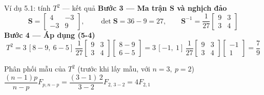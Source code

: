 \begin{frame}{Ví dụ 5.1: tính \texorpdfstring{\(T^2\)}{T2} --- kết quả}
  \small
  \textbf{Bước 3 --- Ma trận \(\mathbf{S}\) và nghịch đảo}
  \[
    \mathbf{S}=
    \begin{bmatrix}
      4 & -3 \\ -3 & 9
    \end{bmatrix},
    \qquad
    \det\mathbf{S} = 36-9 = 27,
    \qquad
    \mathbf{S}^{-1}
    = \frac{1}{27}
    \begin{bmatrix}
      9 & 3 \\ 3 & 4
    \end{bmatrix}
  \]
  \textbf{Bước 4 --- Áp dụng (5-4)}
  \[
    T^2
    = 3\,[8-9,\ 6-5]\,
      \frac{1}{27}
      \begin{bmatrix} 9 & 3 \\ 3 & 4 \end{bmatrix}
      \begin{bmatrix} 8-9 \\ 6-5 \end{bmatrix}
    = 3\,[-1,\ 1]\,\frac{1}{27}
      \begin{bmatrix} 9 & 3 \\ 3 & 4 \end{bmatrix}
      \begin{bmatrix} -1 \\ 1 \end{bmatrix}
    = \boxed{\frac{7}{9}}
  \]
  \vspace{-0.1cm}
  \begin{exampleblock}{Phân phối mẫu của \(T^2\) \textmd{(trước khi lấy mẫu, với \(n=3,\ p=2\))}}
    \centering
    \(
      \dfrac{(n-1)p}{n-p}F_{p,n-p}
      = \dfrac{(3-1)\,2}{3-2}F_{2,\,3-2}
      = 4F_{2,1}
    \)
  \end{exampleblock}
\end{frame}

